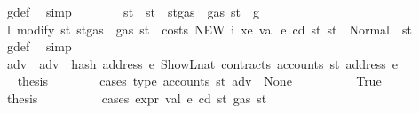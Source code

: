 \begin{isabellebody}
\ g{\isacharunderscore}{\kern0pt}def\ \isamarkupfalse%
\ simp\isanewline
\ \ \ \ \ \ \isamarkupfalse%
\ st{\isacharprime}{\kern0pt}\ \ {\isachardoublequoteopen}st{\isacharprime}{\kern0pt}\ {\isacharequal}{\kern0pt}\ st{\isasymlparr}gas\ {\isacharcolon}{\kern0pt}{\isacharequal}{\kern0pt}\ gas\ st\ {\isacharminus}{\kern0pt}\ g{\isasymrparr}{\isachardoublequoteclose}\isanewline
\ \ \ \ \ \ \isamarkupfalse%
\ \isamarkupfalse%
\ l{}{\isacharcolon}{\kern0pt}\ {\isachardoublequoteopen}modify\ {\isacharparenleft}{\kern0pt}{\isasymlambda}st{\isachardot}{\kern0pt}\ st{\isasymlparr}gas\ {\isacharcolon}{\kern0pt}{\isacharequal}{\kern0pt}\ gas\ st\ {\isacharminus}{\kern0pt}\ costs\ {\isacharparenleft}{\kern0pt}NEW\ i\ xe\ val{\isacharparenright}{\kern0pt}\ e\ cd\ st{\isasymrparr}{\isacharparenright}{\kern0pt}\ st\ {\isacharequal}{\kern0pt}\ Normal\ {\isacharparenleft}{\kern0pt}{\isacharparenleft}{\kern0pt}{\isacharparenright}{\kern0pt}{\isacharcomma}{\kern0pt}\ st{\isacharprime}{\kern0pt}{\isacharparenright}{\kern0pt}{\isachardoublequoteclose}\ \isamarkupfalse%
\ g{\isacharunderscore}{\kern0pt}def\ \isamarkupfalse%
\ simp\isanewline
\ \ \ \ \ \ \isamarkupfalse%
\ adv\ \ {\isachardoublequoteopen}adv\ {\isacharequal}{\kern0pt}\ hash\ {\isacharparenleft}{\kern0pt}address\ e{\isacharparenright}{\kern0pt}\ {\isacharparenleft}{\kern0pt}ShowL\isactrlsub n\isactrlsub a\isactrlsub t\ {\isacharparenleft}{\kern0pt}contracts\ {\isacharparenleft}{\kern0pt}accounts\ st{\isacharprime}{\kern0pt}\ {\isacharparenleft}{\kern0pt}address\ e{\isacharparenright}{\kern0pt}{\isacharparenright}{\kern0pt}{\isacharparenright}{\kern0pt}{\isacharparenright}{\kern0pt}{\isachardoublequoteclose}\isanewline
\ \ \ \ \ \ \isamarkupfalse%
\ \isamarkupfalse%
\ {\isacharquery}{\kern0pt}thesis\isanewline
\ \ \ \ \ \ \isamarkupfalse%
\ {\isacharparenleft}{\kern0pt}cases\ {\isachardoublequoteopen}type\ {\isacharparenleft}{\kern0pt}accounts\ st{\isacharprime}{\kern0pt}\ adv{\isacharparenright}{\kern0pt}\ {\isacharequal}{\kern0pt}\ None{\isachardoublequoteclose}{\isacharparenright}{\kern0pt}\isanewline
\ \ \ \ \ \ \ \ \isamarkupfalse%
\ True\isanewline
\ \ \ \ \ \ \ \ \isamarkupfalse%
\ \isamarkupfalse%
\ {\isacharquery}{\kern0pt}thesis\isanewline
\ \ \ \ \ \ \ \ \isamarkupfalse%
\ {\isacharparenleft}{\kern0pt}cases\ {\isachardoublequoteopen}expr\ val\ e\ cd\ st{\isacharprime}{\kern0pt}\ {\isacharparenleft}{\kern0pt}gas\ st{\isacharprime}{\kern0pt}{\isacharparenright}{\kern0pt}{\isachardoublequoteclose}{\isacharparenright}{\kern0pt}\isanewline

\end{isabellebody}
